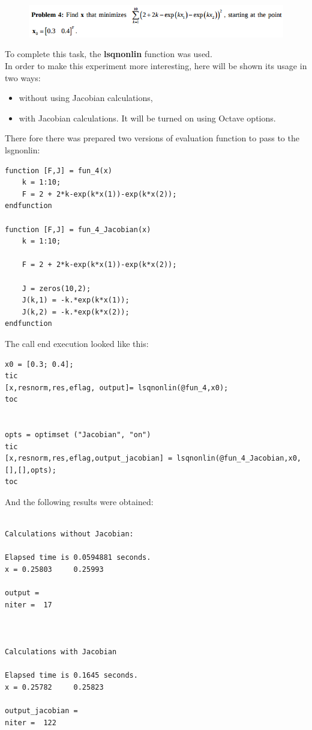 \documentclass[eng,openany]{mgr}
\begin{document}
\begin{figure}[h]
\centering
\includegraphics[width=0.7\linewidth]{screenshot007}
\label{fig:screenshot007}
\end{figure}
To complete this task, the \textbf{lsqnonlin} function was used.\\
In order to make this experiment more interesting, here will be shown its usage in two ways:
\begin{itemize}
	\item without using Jacobian calculations,
	\item with Jacobian calculations. It will be turned on using Octave options.
\end{itemize}
There fore there was prepared two versions of evaluation function to pass to the lsgnonlin:\begin{lstlisting}
function [F,J] = fun_4(x)
	k = 1:10;
	F = 2 + 2*k-exp(k*x(1))-exp(k*x(2));
endfunction

function [F,J] = fun_4_Jacobian(x)
	k = 1:10;
	
	F = 2 + 2*k-exp(k*x(1))-exp(k*x(2));
	
	J = zeros(10,2);
	J(k,1) = -k.*exp(k*x(1));
	J(k,2) = -k.*exp(k*x(2));
endfunction
\end{lstlisting}

The call end execution looked like this:
\begin{lstlisting}
x0 = [0.3; 0.4];
tic
[x,resnorm,res,eflag, output]= lsqnonlin(@fun_4,x0);
toc


opts = optimset ("Jacobian", "on")
tic
[x,resnorm,res,eflag,output_jacobian] = lsqnonlin(@fun_4_Jacobian,x0,[],[],opts);
toc
\end{lstlisting}

And the following results were obtained:
\begin{lstlisting}

Calculations without Jacobian:

Elapsed time is 0.0594881 seconds.
x =	0.25803		0.25993

output =
niter =  17



Calculations with Jacobian

Elapsed time is 0.1645 seconds.
x =	0.25782		0.25823

output_jacobian =
niter =  122
\end{lstlisting}
\end{document}
